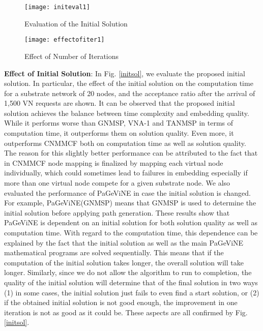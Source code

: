 \documentclass[journal]{IEEEtran}
\begin{document}
\begin{figure*}[ht!]
\setlength{\abovecaptionskip}{7pt plus 0pt minus 0pt}
\setlength{\belowcaptionskip}{7pt plus 0pt minus 0pt}
\begin{minipage}{.5\textwidth}
\centering
\resizebox{.99\textwidth}{!}
 {\texttt{[image: initeval1]}}
  \caption{Evaluation of the Initial Solution}
  \label{initsol}
\end{minipage}
\begin{minipage}{.5\textwidth}
\resizebox{.99\textwidth}{!}
{\texttt{[image: effectofiter1]}}
  \caption{Effect of Number of Iterations}
  \label{numiter}
\end{minipage}
\end{figure*}


\noindent \textbf{Effect of Initial Solution}: In Fig. \ref{initsol}, we evaluate the proposed initial solution. In particular, the effect of the initial solution on the computation time for a substrate network of 20 nodes, and the acceptance ratio after the arrival of 1,500 VN requests are shown. It can be observed that the proposed initial solution achieves the balance between time complexity and embedding quality. While it performs worse than GNMSP, VNA-1 and TANMSP in terms of computation time, it outperforms them on solution quality. Even more, it outperforms CNMMCF both on computation time as well as solution quality. The reason for this slightly better performance can be attributed to the fact that in CNMMCF node mapping is finalized by mapping each virtual node individually, which could sometimes lead to failures in embedding especially if more than one virtual node compete for a given substrate node. We also evaluated the performance of PaGeViNE in case the initial solution is changed. For example, PaGeViNE(GNMSP) means that GNMSP is used to determine the initial solution before applying path generation. These results show that PaGeViNE is dependent on an initial solution for both solution quality as well as computation time. With regard to the computation time, this dependence can be explained by the fact that the initial solution as well as the main PaGeViNE mathematical programs are solved sequentially. This means that if the computation of the initial solution takes longer, the overall solution will take longer. Similarly, since we do not allow the algorithm to run to completion, the quality of the initial solution will determine that of the final solution in two ways (1) in some cases, the initial solution just fails to even find a start solution, or (2) if the obtained initial solution is not good enough, the improvement in one iteration is not as good as it could be. These aspects are all confirmed by Fig. \ref{initsol}.\\
\end{document}
